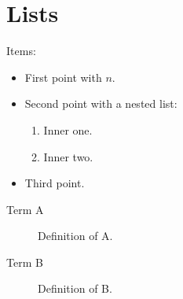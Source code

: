 
\section{Lists}
Items:
\begin{itemize}
  \item First point with $n$.
  \item Second point with a nested list:
  \begin{enumerate}
    \item Inner one.
    \item Inner two.
  \end{enumerate}
  \item Third point.
\end{itemize}

\begin{description}
  \item[Term A] Definition of A.
  \item[Term B] Definition of B.
\end{description}

